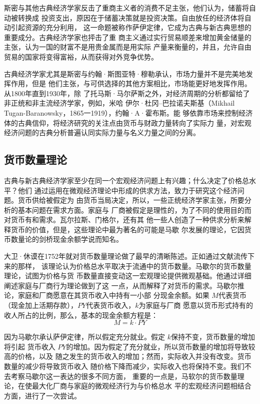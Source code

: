 斯密与其他古典经济学家反击了重商主义者的消费不足主张，他们认为，储蓄将自动被转换成
投资支出，原因在于储蓄决策就是投资决策。自由放任的经济体将自动引起资源的充分利用，
这一命题被称作萨伊定律，它成为古典与新古典思想的重要成分。古典经济学家也抨击了重
商主义通过实行贸易顺差来增加黄金储量的主张，认为一国的财富不是用贵金属而是用实际
产量来衡量的，并且，允许自由贸易的国家将变得富裕，从而获得对外竞争优势。

古典经济学家尤其是斯密与约翰·斯图亚特·穆勒承认，市场力量并不是完美地发挥作用，但是
他们主张，与可供选择的其他方案相比，市场能更好地发挥作用。从1800年直到1930年，除
了托马斯·马尔萨斯之外，对经济周期的分析都留给了非正统和非主流经济学家，例如，米哈
伊尔·杜冈--巴拉诺夫斯基（Mikhail Tugan-Baranowsky，1865一1919），约翰·A·霍布斯。能
够依靠市场来控制经济体的古典信仰，将经济研究的关注点由货币与财政力量转向了实际力
量，对宏观经济问题的古典分析普遍认同实际力量与名义力量之间的分离。
\clearpage

\subsection{货币数量理论}

古典与新古典经济学家至少在同一个宏观经济问题上有兴趣；什么决定了价格总水平？他们
通过运用在微观经济理论中形成的供求方法，致力于研究这个经济问题。货币供给被假定为
由货币当局决定，所以，一些正统经济学家主张，所要分析的基本问题在需求方面。家庭与
厂商被假定是理性的，为了不同的使用目的而对货币有和需求。瓦尔拉斯、门格尔，还有其
他一些人创造了一种供求分析来解释货币的价值，但是，这些理论中最为著名的可能是马歇
尔发展的理论，它因货币数量论的剑桥现金余额学说而知名。

大卫·休谟在1752年就对货币数量理论做了最早的清晰陈述。正如通过文献流传下来的那样，
该理论认为价格总水平取决于流通中的货币数量。马歇尔的货币数量理论，试图为价格与货
币数量直接变动这一宏观理论提供微观基础。他通过详细阐述家庭与厂商行为理论做到了这
一点，从而解释了对货币的需求。马歇尔推论，家庭和厂商愿意在其货币收入中持有一小部
分现金余额。如果 $M$代表货币（现金加上活期存款），$PY$代表货币收入，$k$为家庭与厂商
愿意以货币形式持有的收人所占的比例，那么，基本的现金余额方程是：
\[ M = k \cdot PY\]

因为马歇尔承认萨伊定律，所以假定充分就业。假定 $k$保持不变，货币数量的增加将引起
货币收入 $PY$的增加。因为假定了充分就业，所以货币数量的增加将导致较高的价格，以及
随之发生的货币收入的增加；然而，实际收入并没有改变。货币数量的减少将导致货币收入
随价格下降而减少，实际收入也将保持不变。我们不去考察马歇尔这一表达的很多不同方面，
重要的一点是，马软尔的货币数量理论，在使最大化厂商与家庭的微观经济行为与价格总水
平的宏观经济问题相结合方面，进行了一次尝试。

